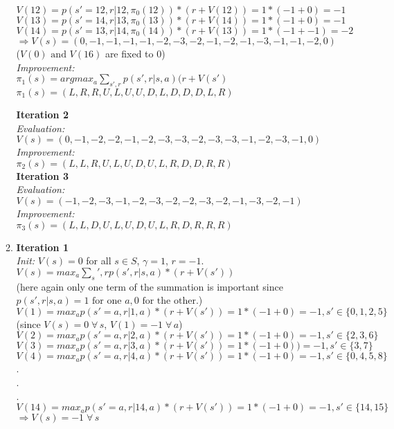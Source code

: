 \documentclass[11pt]{article}
\begin{document}
\begin{enumerate}
\begin{enumerate}
		$V(12) = p(s'=12, r | 12, \pi_0(12)) * (r + V(12)) = 1*(-1 + 0) = -1$ \\
		$V(13) = p(s'=14, r | 13, \pi_0(13)) * (r + V(14)) = 1*(-1 + 0) = -1$ \\
		$V(14) = p(s'=13, r | 14, \pi_0(14)) * (r + V(13)) = 1*(-1 + -1) = -2$ \\
		$\Rightarrow V(s) = (0, -1, -1, -1, -1, -2, -3, -2, -1, -2, -1, -3, -1, -1, -2, 0)$ \\
		($V(0) \text{ and } V(16)$ are fixed to $0$)\\
		\textit{Improvement:} \\
		$\pi_1(s) = argmax_a \sum_{s',r} p(s',r | s,a) (r+ V(s')$ \\
		$\pi_1(s) = (L, R, R, U, L, U, U, D, L, D, D, D, L, R)$
		
		\textbf{Iteration 2} \\
		\textit{Evaluation:} \\
		$V(s) = (0, -1, -2, -2, -1, -2, -3, -3, -2, -3,  -3,  -1, -2, -3, -1, 0)$ \\
		\textit{Improvement:} \\
		$\pi_2(s) = (L, L, R, U, L, U, D,  U, L, R, D, D, R, R)$ \\
		
		\textbf{Iteration 3} \\
		\textit{Evaluation:} \\
		$V(s) = (-1, -2, -3, -1, -2, -3, -2, -2, -3, -2, -1, -3, -2, -1) $\\
		\textit{Improvement:} \\
		$\pi_3(s) = (L, L, D, U, L, U, D, U, L, R, D, R, R, R)$ \\
		
		\item
		\textbf{Iteration 1} \\
		\textit{Init:} $V(s) = 0$ for all $s \in S$, $\gamma = 1$, $r=-1$. \\
		$V(s) = max_a \sum_s',r p(s', r | s, a) * (r + V(s'))$ \\
		(here again only one term of the summation is important since 
		$p(s', r | s, a) = 1 \text{ for one } a, 0 \text{ for the other}$.) \\
		$V(1) = max_a p(s'=a, r| 1, a) * (r + V(s')) = 1 * (-1 + 0) = -1 , s' \in \{0,1,2,5\}$ \\ 
		(since $V(s) = 0 \; \forall \, s$, $V(1) = -1 \; \forall \, a$) \\
		$V(2) = max_a p(s'=a, r| 2, a) * (r + V(s')) = 1 * (-1+0) = -1, s' \in \{ 2,3,6\}$ \\
		$V(3) = max_a p(s'=a, r| 3, a) * (r + V(s')) = 1 * (-1+0)) = -1, s' \in \{ 3,7\}$ \\
		$V(4) = max_a p(s'=a, r| 4, a) * (r + V(s')) = 1 * (-1 + 0) = -1, s' \in \{ 0,4,5,8\}$ \\
		. \\
		. \\
		. \\
		$V(14) = max_a p(s'=a, r| 14, a) * (r + V(s')) = 1 * (-1 + 0) = -1, s' \in \{ 14,15\}$ \\
		$\Rightarrow V(s) = -1 \; \forall \, s$ \\
		

\end{enumerate}
\end{enumerate}
\end{document}
